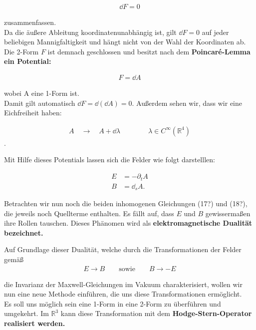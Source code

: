 \begin{align}
\dd F = 0
\end{align}

zusammenfassen. \\



Da die äußere Ableitung koordinatenunabhängig ist, gilt $\dd F = 0$ auf jeder beliebigen Mannigfaltigkeit und hängt nicht von der Wahl der Koordinaten ab. \\
Die 2-Form $F$ ist demnach geschlossen und besitzt nach dem \bfseries Poincaré-Lemma \normalfont ein Potential:

\begin{align}
F = \dd A 
\end{align}

wobei A eine 1-Form ist. \\
Damit gilt automatisch $ \dd F = \dd (\dd A) = 0$. Außerdem sehen wir, dass wir eine Eichfreiheit haben:

\begin{align}
A \quad \rightarrow \quad A + \dd \lambda \qquad\qquad \lambda \in C^{\infty}(\mathbb{R}^4)
\end{align}.

Mit Hilfe dieses Potentials lassen sich die Felder wie folgt darstelllen:

\begin{align}
E &= -\partial_t A \\
B &= \dd_s A.
\end{align}

Betrachten wir nun noch die beiden inhomogenen Gleichungen (17?) und (18?), die jeweils noch Quellterme enthalten. Es fällt auf, dass $E$ und $B$ gewissermaßen ihre Rollen tauschen. Dieses Phänomen wird als \bfseries elektromagnetische Dualität \normalfont bezeichnet.

Auf Grundlage dieser Dualität, welche durch die Transformationen der Felder gemäß
\begin{align*}
E \rightarrow B \qquad \text{sowie} \qquad B \rightarrow -E
\end{align*}

die Invarianz der Maxwell-Gleichungen im Vakuum charakterisiert, wollen wir nun eine neue Methode einführen, die uns diese Transformationen ermöglicht. \\
Es soll uns möglich sein eine 1-Form in eine 2-Form zu überführen und umgekehrt. Im $\mathbb{R}^3$ kann diese Transformation mit dem \bfseries Hodge-Stern-Operator \normalfont realisiert werden.
